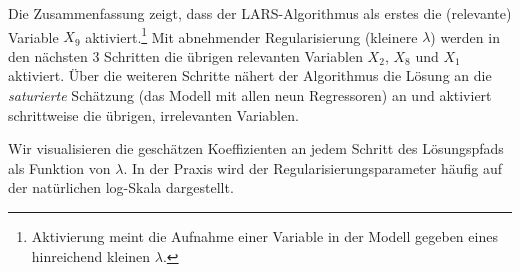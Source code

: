 \documentclass[
  a4paper,
  DIV=11,
  oneside]{scrreprt}
\newenvironment{Shaded}{\begin{snugshade}}{\end{snugshade}}
\newcommand{\AttributeTok}[1]{\textcolor[rgb]{0.40,0.45,0.13}{#1}}
\newcommand{\CommentTok}[1]{\textcolor[rgb]{0.37,0.37,0.37}{#1}}
\newcommand{\DecValTok}[1]{\textcolor[rgb]{0.68,0.00,0.00}{#1}}
\newcommand{\FloatTok}[1]{\textcolor[rgb]{0.68,0.00,0.00}{#1}}
\newcommand{\FunctionTok}[1]{\textcolor[rgb]{0.28,0.35,0.67}{#1}}
\newcommand{\NormalTok}[1]{\textcolor[rgb]{0.00,0.23,0.31}{#1}}
\newcommand{\SpecialCharTok}[1]{\textcolor[rgb]{0.37,0.37,0.37}{#1}}
\newcommand{\StringTok}[1]{\textcolor[rgb]{0.13,0.47,0.30}{#1}}
\begin{document}
Die Zusammenfassung zeigt, dass der LARS-Algorithmus als erstes die
(relevante) Variable \(X_9\) aktiviert.\footnote{Aktivierung meint die
  Aufnahme einer Variable in der Modell gegeben eines hinreichend
  kleinen \(\lambda\).} Mit abnehmender Regularisierung (kleinere
\(\lambda\)) werden in den nächsten 3 Schritten die übrigen relevanten
Variablen \(X_2\), \(X_8\) und \(X_1\) aktiviert. Über die weiteren
Schritte nähert der Algorithmus die Lösung an die \emph{saturierte}
Schätzung (das Modell mit allen neun Regressoren) an und aktiviert
schrittweise die übrigen, irrelevanten Variablen.

Wir visualisieren die geschätzen Koeffizienten an jedem Schritt des
Lösungspfads als Funktion von \(\lambda\). In der Praxis wird der
Regularisierungsparameter häufig auf der natürlichen log-Skala
dargestellt.

\begin{Shaded}
\end{Shaded}
\end{document}
